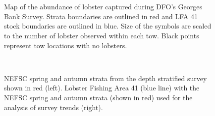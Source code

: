 \documentclass[11pt]{article}
\newcommand{\D}{.}
\newcommand{\e}{/SpinDr/backup/bio_data/bio.lobster/figures/} %
\begin{document}
\begin{landscape}


        \begin{figure}
        \centering
                    \\
                    \\

         \caption{Map of the abundance of lobster captured during DFO's Georges Bank Survey. Strata boundaries are outlined in red and LFA 41 stock boundaries are outlined in blue. Size of the symbols are scaled to the number of lobster observed within each tow. Black points represent tow locations with no lobsters.}
        \end{figure}
        \clearpage

\begin{figure}
\centering
        \\
\caption{NEFSC spring and autumn strata from the depth stratified survey shown in red (left). Lobster Fishing Area 41 (blue line) with the NEFSC spring and autumn strata (shown in red) used for the analysis of survey trends (right).}
\end{figure}


\end{landscape}
\end{document}
